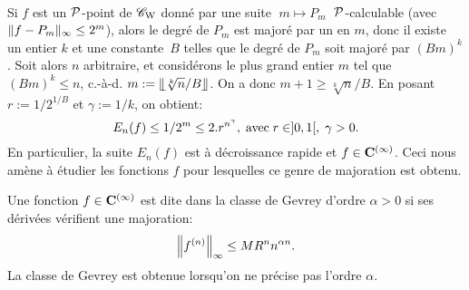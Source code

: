 \smallskip{} \\
Si $f$ est un  ${\cal P}$-point de  ${{{\mathscr C}}_{\rm W}}$   donné par une suite 
$\; m \mapsto P_m\; $
 ${\cal P}$-calculable (avec $\lVert  f - P_m \rVert_{\infty} \leq 2^m$), alors 
le degré de $P_m$  
est majoré par un \pol en  $m$,  donc il existe un entier $ k $ et une 
constante~$ B $ telles que le degré de $ P_m $ soit majoré par $(Bm)^k$. 
Soit alors $ n $ arbitraire, et considérons le plus grand entier $ m $ tel que  
$(Bm)^k \leq n$,  c.-à-d.  $m := \llfloor \sqrt[k]{n}/B \rrfloor$. 
On a donc  $m+1 \geq \sqrt[k]{n}/B$.  En posant  $r := 1/2^{1/B}$
  et   $\gamma := 1/k$,  on obtient:  
$$E_n(f) \leq 1/2^m \leq 2.r^{n^{\gamma}}, \; \hbox{avec} \; r \in ]0,1[, \; 
\gamma > 0.$$
En particulier, la suite  $E_n(f)$  est à décroissance rapide et $f\in{\bf C}^{(\infty)}$.
Ceci nous amène à étudier les fonctions $f$ pour lesquelles ce genre de 
majoration est obtenu.

\begin{fdefinition} \label{f523}

Une fonction $f\in {\bf C}^{(\infty)}$ est dite dans la classe de Gevrey d'ordre $\alpha > 0 $ 
si ses dérivées vérifient une majoration:   
\[
\Big\lVert f^{(n)}  \Big\rVert_{\infty}\leq  MR^n n^{\alpha n}.
\]
La classe de Gevrey est obtenue lorsqu'on ne précise pas l'ordre  $\alpha$. 
\end{fdefinition}

